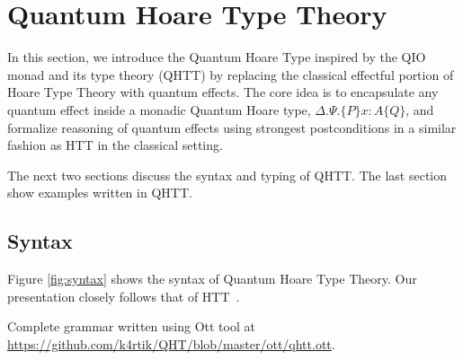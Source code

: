 \documentclass[acmsmall,nonacm,timestamp]{acmart}
\begin{document}
\section{Quantum Hoare Type Theory}
\label{sec:qhtt}
In this section, we introduce the Quantum Hoare Type inspired by the QIO monad and its type theory (QHTT) by replacing the classical effectful portion of Hoare Type Theory with quantum effects. The core idea is to encapsulate any quantum effect inside a monadic Quantum Hoare type, $\Delta. \Psi .\{P\} x{ : }A \{Q\}$, and formalize reasoning of quantum effects using strongest postconditions in a similar fashion as HTT in the classical setting.

The next two sections discuss the syntax and typing of QHTT. The last section show examples written in QHTT.

\subsection{Syntax}
\label{sec:syntax}

Figure \ref{fig:syntax} shows the syntax of Quantum Hoare Type Theory. Our presentation closely follows that of HTT~\cite{nanevski_hoare_2008}.

Complete grammar written using Ott tool at \url{https://github.com/k4rtik/QHT/blob/master/ott/qhtt.ott}.
\end{document}
